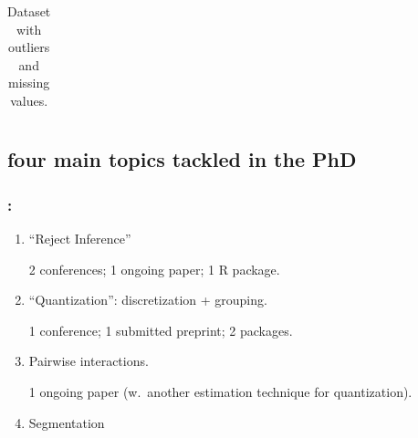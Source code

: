 \documentclass[english,xcolor={rgb,dvipsnames,table,usenames}]{beamer}
\begin{document}
\begin{frame}
{\begin{table}
\begin{tiny}
\begin{tabular}{p{2cm}|p{1.1cm}|p{1cm}|p{2.4cm}||p{0.6cm}|p{1cm}}
\end{tabular}
\end{tiny}
\caption{\label{tab:exemple} Dataset with outliers and missing values.}
\end{table}
}
\vspace{-0.5cm}

\end{frame}



\subsection{four main topics tackled in the PhD}

\begin{frame}
\frametitle{\secname : \subsecname}

\normalsize

\begin{enumerate}
\item<1-> ``Reject Inference''

2 conferences; 1 ongoing paper; 1 \textsf{R} package.

\medskip

\item<2-> ``Quantization'': discretization + grouping.

1 conference; 1 submitted preprint; 2 packages.

\medskip

\item<3-> Pairwise interactions.

1 ongoing paper (w.\ another estimation technique for quantization).

\medskip

\item<4-> Segmentation
\end{enumerate}

\end{frame}
\end{document}
